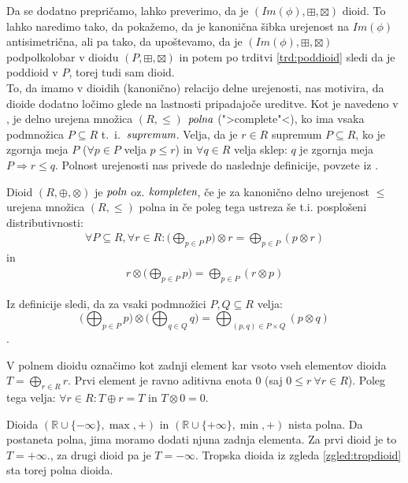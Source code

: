 \documentclass[mat1]{fmfdelo}
\newcommand{\R}{\mathbb{R}}
\newcommand{\pojem}[1]{\ensuremath{\emph{#1}}}
\begin{document}
Da se dodatno prepričamo, lahko preverimo, da je $(Im(\phi), \boxplus, \boxtimes)$ dioid. To lahko naredimo tako, da pokažemo, da je kanonična šibka urejenost na $Im(\phi)$ antisimetrična, ali pa tako, da upoštevamo, da je $(Im(\phi), \boxplus, \boxtimes)$ podpolkolobar v dioidu $(P, \boxplus, \boxtimes)$ in potem po trditvi \ref{trd:poddioid} sledi da je poddioid v $P$, torej tudi sam dioid.
\newline \\
To, da imamo v dioidih (kanonično) relacijo delne urejenosti, nas motivira, da dioide dodatno ločimo glede na lastnosti pripadajoče ureditve. Kot je navedeno v \cite[str. 10]{bib:Gondran}, je delno urejena množica $(R, \leq)$ \pojem{polna }(">complete"<), ko ima vsaka podmnožica $P \subseteq R$ t.~i.~\pojem{supremum}. 
Velja, da je $r\in R$ supremum $P\subseteq R$, ko je zgornja meja $P$ ($\forall p \in P$ velja $ p \leq r$) in $\forall q \in R$ velja sklep: $q$ je zgornja meja $P \Rightarrow r \leq q$. Polnost urejenosti nas privede do naslednje definicije, povzete iz \cite[definicija 6.\,1.\,8.\,]{bib:Gondran}.

\begin{definicija}
	Dioid $(R, \oplus,\otimes)$ je \pojem{poln} oz. \pojem{kompleten}, če je za kanonično delno urejenost $\leq$ urejena množica $(R, \leq)$ polna in če poleg tega ustreza še t.i. posplošeni distributivnosti: \begin{align*}
		\forall P \subseteq R, \forall r \in R: \big(\bigoplus_{p\in P}p\big) \otimes r = \bigoplus_{p\in P} \left(p \otimes r\right)
	\end{align*}
in
\begin{align*}
	r \otimes \big( \bigoplus_{p\in P} p \big) = \bigoplus_{p \in P} \left( r \otimes p \right)
\end{align*}
\end{definicija}

Iz definicije sledi, da za vsaki podmnožici $P, Q \subseteq R$ velja: $$\big( \bigoplus_{p\in P} p \big) \otimes \big( \bigoplus_{q\in Q} q \big) = \bigoplus_{(p, q) \in P\times Q} (p \otimes q)$$.

V polnem dioidu označimo kot zadnji element kar vsoto vseh elementov dioida $T = \bigoplus_{r \in R} r$. Prvi element je ravno aditivna enota $0$ (saj $0\leq r~\forall r\in R$). Poleg tega velja: $\forall r\in R: T \oplus r = T$ in $T \otimes 0 = 0$.

\begin{zgled}
	Dioida $(\R\cup \{-\infty\}, \max, +)$ in $(\R\cup \{+\infty\}, \min, +)$ nista polna. Da postaneta polna, jima moramo dodati njuna zadnja elementa. Za prvi dioid je to $T = +\infty$., za drugi dioid pa je $T = -\infty$. Tropska dioida iz zgleda \ref{zgled:tropdioid} sta torej polna dioida.
\end{zgled}
\end{document}
